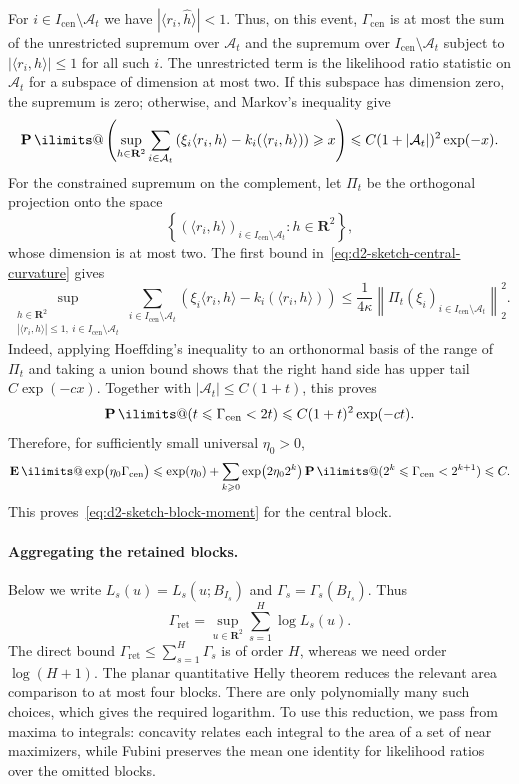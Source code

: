 \documentclass[11pt, letterpaper, hidelinks]{article}
\makeatletter
\renewcommand{\proofname}{\textit{\textbf{Proof}}}
\renewenvironment{proof}[1][\proofname]{\par\pushQED{\qed}\normalfont \topsep6\p@\@plus6\p@\relax\trivlist\item[\hskip\labelsep#1\@addpunct{}]\ignorespaces}{\popQED\endtrivlist\@endpefalse}
\newcommand{\proofsketchname}{\textit{\textbf{Proof sketch}}}
\newenvironment{proofsketch}
  {\begin{proof}[\proofsketchname]}
  {\end{proof}}
\newcommand{\R}{\mathbf R}
\newcommand{\1}{\mathbf 1}
\renewcommand{\leq}{\leqslant}
\renewcommand{\geq}{\geqslant}
\newcommand{\E}{\operatorname*{\mathbf{E}}\ilimits@}
\renewcommand{\P}{\operatorname*{\mathbf{P}}\ilimits@}
\theoremstyle{plain}
\theoremstyle{definition}
\makeatother
\begin{document}
\begin{proofsketch}
For $i\in I_{\mathrm{cen}}\setminus\mathcal A_t$ we have
$|\langle r_i,\widehat h\rangle|<1$.  Thus, on this event,
$\Gamma_{\mathrm{cen}}$ is at most the sum of the unrestricted supremum over
$\mathcal A_t$ and the supremum over $I_{\mathrm{cen}}\setminus\mathcal A_t$
subject to $|\langle r_i,h\rangle|\leq1$ for all such $i$.
The unrestricted term is the likelihood ratio statistic on $\mathcal A_t$
for a subspace of dimension at most two.  If
this subspace has dimension zero, the supremum is zero; otherwise,
 and Markov's inequality give
\[
\P\left(
\sup_{h\in\R^2}\sum_{i\in\mathcal A_t}
\left(\xi_i\langle r_i,h\rangle-k_i(\langle r_i,h\rangle)\right)
\geq x\right)
\leq C(1+|\mathcal A_t|)^2\exp(-x).
\]
For the constrained supremum on the complement, let $\Pi_t$ be the orthogonal
projection onto the space
\[
\left\{(\langle r_i,h\rangle)_{i\in I_{\mathrm{cen}}\setminus\mathcal A_t}:
h\in\R^2\right\},
\]
whose dimension is at most two.  The first bound
in~\eqref{eq:d2-sketch-central-curvature} gives
\[
\sup_{\substack{h\in\R^2\\
|\langle r_i,h\rangle|\leq1,\ i\in I_{\mathrm{cen}}\setminus\mathcal A_t}}
\sum_{i\in I_{\mathrm{cen}}\setminus\mathcal A_t}
\left(\xi_i\langle r_i,h\rangle-k_i(\langle r_i,h\rangle)\right) \leq
\frac{1}{4\kappa}
\left\|\Pi_t(\xi_i)_{i\in I_{\mathrm{cen}}\setminus\mathcal A_t}\right\|_2^2.
\]
Indeed, applying Hoeffding's inequality to an orthonormal basis of the range
of $\Pi_t$ and taking a union bound shows that the right hand side has upper
tail $C\exp(-cx)$.  Together with
$|\mathcal A_t|\leq C(1+t)$, this proves
\[
\P(t\leq\Gamma_{\mathrm{cen}}<2t)
\leq C(1+t)^2\exp(-ct).
\]
Therefore, for sufficiently small universal $\eta_0>0$,
\[
\E\exp\bigl(\eta_0\Gamma_{\mathrm{cen}}\bigr)
\leq \exp(\eta_0)+\sum_{k\geq0}\exp\bigl(2\eta_0 2^k\bigr)
\P(2^k\leq\Gamma_{\mathrm{cen}}<2^{k+1})
\leq C.
\]
This proves~\eqref{eq:d2-sketch-block-moment} for the central block.

\paragraph{Aggregating the retained blocks.}
Below we write $L_s(u)=L_s(u;B_{I_s})$ and
$\Gamma_s=\Gamma_s(B_{I_s})$.  Thus
\[
\Gamma_{\mathrm{ret}}
=\sup_{u\in\R^2}\sum_{s=1}^H\log L_s(u).
\]
The direct bound $\Gamma_{\mathrm{ret}}\leq\sum_{s=1}^H\Gamma_s$ is of order
$H$, whereas we need order $\log(H+1)$.  The planar quantitative Helly theorem
reduces the relevant area comparison to at most four blocks.  There are only
polynomially many such choices, which gives the required logarithm.  To use
this reduction, we pass from maxima to integrals: concavity relates each
integral to the area of a set of near maximizers, while Fubini preserves the
mean one identity for likelihood ratios over the omitted blocks.


\end{proofsketch}
\end{document}
